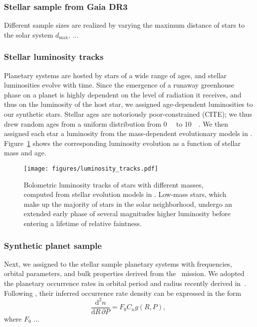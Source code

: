 \documentclass[modern]{aastex631}
\begin{document}
\subsubsection{Stellar sample from Gaia DR3}
Different sample sizes are realized by varying the maximum distance of stars to the solar system $d_\mathrm{max}$.
...

\subsubsection{Stellar luminosity tracks}
    Planetary systems are hosted by stars of a wide range of ages, and stellar luminosities evolve with time.
    Since the emergence of a runaway greenhouse phase on a planet is highly dependent on the level of radiation it receives, and thus on the luminosity of the host star, we assigned age-dependent luminosities to our synthetic stars.
    Stellar ages are notoriously poor-constrained (CITE); we thus drew random ages from a uniform distribution from \SI{0}{\giga\year} to \SI{10}{\giga\year}.
    We then assigned each star a luminosity from the mass-dependent evolutionary models in \citet{Baraffe1998}.
    Figure~\ref{fig:luminosity_tracks} shows the corresponding luminosity evolution as a function of stellar mass and age.
\begin{figure}[ht!]
    \begin{centering}
        \texttt{[image: figures/luminosity\_tracks.pdf]}
        \caption{
            Bolometric luminosity tracks of stars with different masses, computed from stellar evolution models in \citet{Baraffe1998}.
            Low-mass stars, which make up the majority of stars in the solar neighborhood, undergo an extended early phase of several magnitudes higher luminosity before entering a lifetime of relative faintness.
        }
        \label{fig:luminosity_tracks}
    \end{centering}
\end{figure}


\subsubsection{Synthetic planet sample}\label{sec:syn_planets}
Next, we assigned to the stellar sample planetary systems with frequencies, orbital parameters, and bulk properties derived from the \kepler\ mission.
We adopted the planetary occurrence rates in orbital period and radius recently derived in~\citep{Bergsten2022}.
Following \citep{Youdin2011a}, their inferred occurrence rate density can be expressed in the form
\begin{equation}
    \frac{\mathrm{d}^2n}{\mathrm{d}R \, \partial P} = F_0 C_n g(R, P),
\end{equation}
where $F_0$
...
\end{document}
